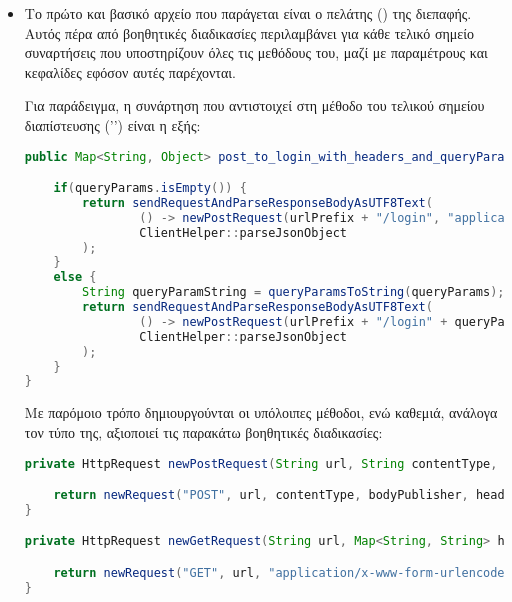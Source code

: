     \begin{itemize}
        \item \underline{}
        
        Το πρώτο και βασικό αρχείο που παράγεται είναι ο πελάτης () της διεπαφής.
        Αυτός πέρα από βοηθητικές διαδικασίες περιλαμβάνει για κάθε τελικό σημείο συναρτήσεις που υποστηρίζουν όλες τις μεθόδους του,
        μαζί με παραμέτρους και κεφαλίδες εφόσον αυτές παρέχονται.
        
        Για παράδειγμα, 
        η συνάρτηση που αντιστοιχεί στη μέθοδο  του τελικού σημείου διαπίστευσης ('') είναι η εξής:

        \begin{lstlisting}[language=java]
public Map<String, Object> post_to_login_with_headers_and_queryParams(String input, Map<String, String> headers, Map<String, List<String>> queryParams) {

    if(queryParams.isEmpty()) {
        return sendRequestAndParseResponseBodyAsUTF8Text(
                () -> newPostRequest(urlPrefix + "/login", "application/x-www-form-urlencoded", HttpRequest.BodyPublishers.ofString(input), headers),
                ClientHelper::parseJsonObject
        );
    }
    else {
        String queryParamString = queryParamsToString(queryParams);
        return sendRequestAndParseResponseBodyAsUTF8Text(
                () -> newPostRequest(urlPrefix + "/login" + queryParamString, "application/x-www-form-urlencoded", HttpRequest.BodyPublishers.ofString(input), headers),
                ClientHelper::parseJsonObject
        );
    }
}
\end{lstlisting}


Με παρόμοιο τρόπο δημιουργούνται οι υπόλοιπες μέθοδοι, 
ενώ καθεμιά, ανάλογα τον τύπο της, αξιοποιεί τις παρακάτω βοηθητικές διαδικασίες:

\begin{lstlisting}[language=java]
private HttpRequest newPostRequest(String url, String contentType, HttpRequest.BodyPublisher bodyPublisher, Map<String, String> headers) {

    return newRequest("POST", url, contentType, bodyPublisher, headers);
}

private HttpRequest newGetRequest(String url, Map<String, String> headers) {

    return newRequest("GET", url, "application/x-www-form-urlencoded", HttpRequest.BodyPublishers.noBody(), headers);
}


\end{lstlisting}
\end{itemize}
